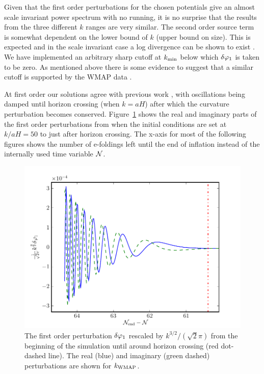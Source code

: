 Given that the first order perturbations for the chosen potentials give an
almost scale invariant power spectrum with no running, it is no surprise that
the results from the three different $k$ ranges are very similar. The second
order source term is somewhat dependent on the lower bound of $k$ (upper bound
on size). This is expected and in the scale invariant case a log divergence can
be shown to exist \cite{Lyth:2007jh}. We have implemented an arbitrary sharp cutoff at $k_{\mathrm{min}}$
below
which 
$\delta\varphi_{1}$ is taken to be zero. As mentioned above there is some evidence to suggest that a 
similar cutoff is supported by the WMAP data \cite{Sinha:2005mn,Kim:2009pf}. 
% 

At first order our solutions agree with previous work
\cite{Salopek:1988qh,Martin:2006rs,Ringeval:2007am}, with oscillations
being damped until horizon crossing (when $k=aH$) after which the
curvature perturbation becomes conserved. Figure~\ref{fig:dp1} shows
the real and imaginary parts of the first order perturbations from
when the initial conditions are set at $k/aH=50$ to just after horizon
crossing. The x-axis for most of the following figures shows the
number of e-foldings left until the end of inflation instead of the
internally used time variable $\mathcal{N}$.
%
% 
\begin{figure}
 \centering
 \includegraphics[scale=0.8]{numerical/graphs/dp1_kwmap}
 \caption{The first order perturbation $\delta\varphi_{1}$ rescaled by
$k^{3/2}/(\sqrt{2}\pi)$ from the beginning of the simulation until around
horizon crossing (red dot-dashed line). The real (blue) and imaginary (green
dashed) perturbations are shown for $k_\mathrm{WMAP}$.}
\label{fig:dp1}
\end{figure}
% 



